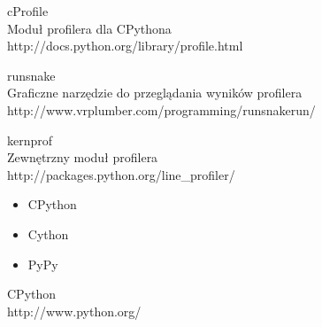 \documentclass{beamer}
\begin{document}
\begin{frame}
cProfile \\
Moduł profilera dla CPythona \\
http://docs.python.org/library/profile.html
\end{frame}

\begin{frame}
runsnake \\
Graficzne narzędzie do przeglądania wyników profilera \\
http://www.vrplumber.com/programming/runsnakerun/ \\
\end{frame}

\begin{frame}
kernprof \\
Zewnętrzny moduł profilera \\
http://packages.python.org/line\_profiler/
\end{frame}

\begin{frame}
\begin{itemize}
\item CPython %
\item Cython %
\item PyPy %
\end{itemize}
\end{frame}

\begin{frame}
CPython \\
http://www.python.org/ \\
\end{frame}
\end{document}
